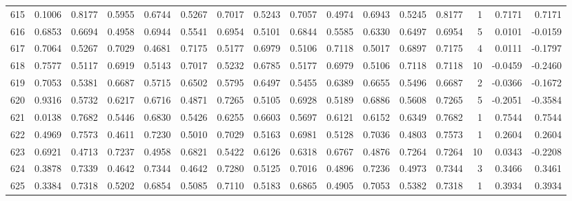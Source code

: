 \begin{tabular}{lrrrrrrrrrrrrrrr}
615 &      0.1006 &  0.8177 &  0.5955 &  0.6744 &  0.5267 &  0.7017 &  0.5243 &  0.7057 &  0.4974 &  0.6943 &   0.5245 &     0.8177 &      1 &                    0.7171 &                     0.7171 \\
616 &      0.6853 &  0.6694 &  0.4958 &  0.6944 &  0.5541 &  0.6954 &  0.5101 &  0.6844 &  0.5585 &  0.6330 &   0.6497 &     0.6954 &      5 &                    0.0101 &                    -0.0159 \\
617 &      0.7064 &  0.5267 &  0.7029 &  0.4681 &  0.7175 &  0.5177 &  0.6979 &  0.5106 &  0.7118 &  0.5017 &   0.6897 &     0.7175 &      4 &                    0.0111 &                    -0.1797 \\
618 &      0.7577 &  0.5117 &  0.6919 &  0.5143 &  0.7017 &  0.5232 &  0.6785 &  0.5177 &  0.6979 &  0.5106 &   0.7118 &     0.7118 &     10 &                   -0.0459 &                    -0.2460 \\
619 &      0.7053 &  0.5381 &  0.6687 &  0.5715 &  0.6502 &  0.5795 &  0.6497 &  0.5455 &  0.6389 &  0.6655 &   0.5496 &     0.6687 &      2 &                   -0.0366 &                    -0.1672 \\
620 &      0.9316 &  0.5732 &  0.6217 &  0.6716 &  0.4871 &  0.7265 &  0.5105 &  0.6928 &  0.5189 &  0.6886 &   0.5608 &     0.7265 &      5 &                   -0.2051 &                    -0.3584 \\
621 &      0.0138 &  0.7682 &  0.5446 &  0.6830 &  0.5426 &  0.6255 &  0.6603 &  0.5697 &  0.6121 &  0.6152 &   0.6349 &     0.7682 &      1 &                    0.7544 &                     0.7544 \\
622 &      0.4969 &  0.7573 &  0.4611 &  0.7230 &  0.5010 &  0.7029 &  0.5163 &  0.6981 &  0.5128 &  0.7036 &   0.4803 &     0.7573 &      1 &                    0.2604 &                     0.2604 \\
623 &      0.6921 &  0.4713 &  0.7237 &  0.4958 &  0.6821 &  0.5422 &  0.6126 &  0.6318 &  0.6767 &  0.4876 &   0.7264 &     0.7264 &     10 &                    0.0343 &                    -0.2208 \\
624 &      0.3878 &  0.7339 &  0.4642 &  0.7344 &  0.4642 &  0.7280 &  0.5125 &  0.7016 &  0.4896 &  0.7236 &   0.4973 &     0.7344 &      3 &                    0.3466 &                     0.3461 \\
625 &      0.3384 &  0.7318 &  0.5202 &  0.6854 &  0.5085 &  0.7110 &  0.5183 &  0.6865 &  0.4905 &  0.7053 &   0.5382 &     0.7318 &      1 &                    0.3934 &                     0.3934 \\

\end{tabular}
